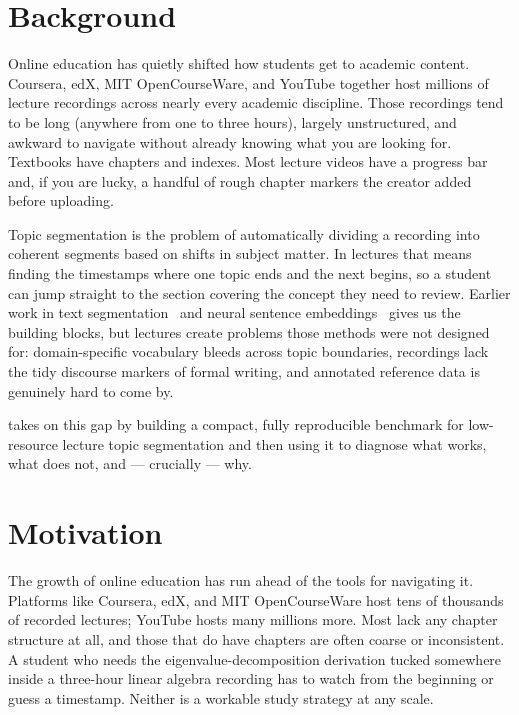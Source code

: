 \section{Background}
\label{sec:background}

Online education has quietly shifted how students get to academic content.
Coursera, edX, MIT OpenCourseWare, and YouTube together host millions of
lecture recordings across nearly every academic discipline. Those recordings
tend to be long (anywhere from one to three hours), largely unstructured, and
awkward to navigate without already knowing what you are looking for. Textbooks
have chapters and indexes. Most lecture videos have a progress bar and,
if you are lucky, a handful of rough chapter markers the creator added
before uploading.

Topic segmentation is the problem of automatically dividing a recording into
coherent segments based on shifts in subject matter. In lectures that means
finding the timestamps where one topic ends and the next begins, so a student
can jump straight to the section covering the concept they need to review.
Earlier work in text segmentation~\cite{hearst1994multi,choi2000latent} and
neural sentence embeddings~\cite{reimers2019sbert} gives us the building
blocks, but lectures create problems those methods were not designed for:
domain-specific vocabulary bleeds across topic boundaries, recordings lack
the tidy discourse markers of formal writing, and annotated reference data
is genuinely hard to come by.

\lecseg{} takes on this gap by building a compact, fully reproducible benchmark
for low-resource lecture topic segmentation and then using it to diagnose what
works, what does not, and --- crucially --- why.

\section{Motivation}
\label{sec:motivation}

The growth of online education has run ahead of the tools for navigating it.
Platforms like Coursera, edX, and MIT OpenCourseWare host tens of thousands
of recorded lectures; YouTube hosts many millions more. Most lack any chapter
structure at all, and those that do have chapters are often coarse or
inconsistent. A student who needs the eigenvalue-decomposition derivation
tucked somewhere inside a three-hour linear algebra recording has to watch
from the beginning or guess a timestamp. Neither is a workable study strategy
at any scale.

